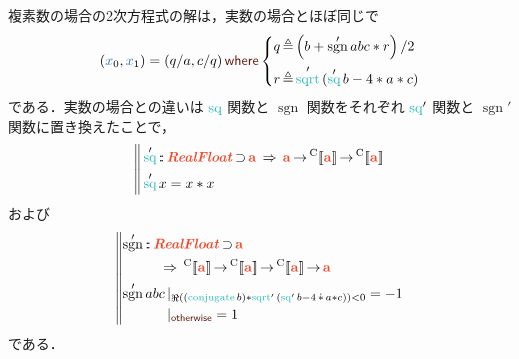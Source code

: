 \documentclass[a5paper,twoside,fleqn,draft]{jsbook}
\def\[{[\![}
\def\]{]\!]}
\DeclareMathOperator{\sgn}{sgn}
\def\keywordColor{Sepia}
\def\varColor{NavyBlue}
\def\funcColor{BlueGreen}
\def\typeColor{RedOrange}
\newcommand{\mBrace}{\Vert}
\newcommand{\mKeyword}[1]{\textcolor{\keywordColor}{\mathsf{#1}}}
\newcommand{\mOtherwiseKeyword}{\mKeyword{otherwise}}
\newcommand{\mWhereKeyword}{\mKeyword{where}}
\DeclareMathOperator{\mOtherwise}{\mOtherwiseKeyword}
\DeclareMathOperator{\mSuperClass}{\;\Rightarrow\;}
\DeclareMathOperator{\mSuperSet}{\supset}
\DeclareMathOperator{\mWhere}{\mWhereKeyword}
\newcommand{\mVar}[1]{\textcolor{\varColor}{#1}}
\newcommand{\mXVar}{\mVar{x}}
\newcommand{\mSpecialFunc}[1]{\textcolor{\funcColor}{\textrm{#1}}}
\DeclareMathOperator{\mConjugate}{\mSpecialFunc{conjugate}}
\DeclareMathOperator{\mRealPart}{\Re}
\DeclareMathOperator{\mSq}{\mSpecialFunc{sq}}
\DeclareMathOperator{\mSqrt}{\mSpecialFunc{sqrt}}
\DeclareMathOperator{\mComplexTimes}{\Dot\ast}
\DeclareMathOperator{\mFuncArrow}{\rightarrow}
\DeclareMathOperator{\mIn}{{:\!:}}
\DeclareMathOperator{\mLetEq}{\triangleq}
\newcommand{\mType}[1]{\textcolor{\typeColor}{\mathbf{#1}}}
\newcommand{\mA}{\mType{a}}
\newcommand{\mTypeAssemble}[2]{{}^\mathrm{#1}\[\mType{#2}\]}
\newcommand{\mCompFunclexType}[1]{\mTypeAssemble{C}{#1}} %
\newcommand{\mTypeClass}[1]{\textcolor{\typeColor}{\textbf{\textit{#1}}}}
\newcommand{\mRealFloatTypeClass}{\mTypeClass{RealFloat}}
\newcommand{\mGuard}[1]{\mathop{\mid_{#1}}}
\begin{document}
複素数の場合の2次方程式の解は，実数の場合とほぼ同じで
\begin{equation}
  (\mXVar_0,\mXVar_1)=(q/a,c/q)\mWhere\left\{
  \begin{aligned}
    &q\mLetEq\left(b+\sgn'abc*r\right)/2\\
    &r\mLetEq\mSqrt'{(\mSq'b-4*a*c)}
  \end{aligned}
  \right.
\end{equation}
である．実数の場合との違いは $\mSq$ 関数と $\sgn$ 関数をそれぞれ
$\mSq'$ 関数と $\sgn'$ 関数に置き換えたことで，
\begin{equation}
  \left\mBrace
  \begin{aligned}
    &\mSq'
    \mIn\mRealFloatTypeClass\mSuperSet\mA
    \mSuperClass\mA
    \mFuncArrow\mCompFunclexType{a}
    \mFuncArrow\mCompFunclexType{a}\\
    &\mSq'x
    =x*x
  \end{aligned}
  \right.
\end{equation}
および
\begin{equation}
  \left\mBrace
  \begin{aligned}
    &\begin{aligned}
       \sgn'
       &\mIn\mRealFloatTypeClass\mSuperSet\mA\\
       &\quad\mSuperClass\mCompFunclexType{a}
       \mFuncArrow\mCompFunclexType{a}
       \mFuncArrow\mCompFunclexType{a}
       \mFuncArrow\mA
     \end{aligned}\\
    &\begin{aligned}
       \sgn'abc
       &\mGuard{\mRealPart((\mConjugate b)*\mSqrt'{(\mSq' b-4\mComplexTimes a*c)})<0}
       =-1\\
       &\mGuard{\mOtherwise}
       =1
     \end{aligned}
  \end{aligned}
  \right.
\end{equation}
である．
\end{document}
